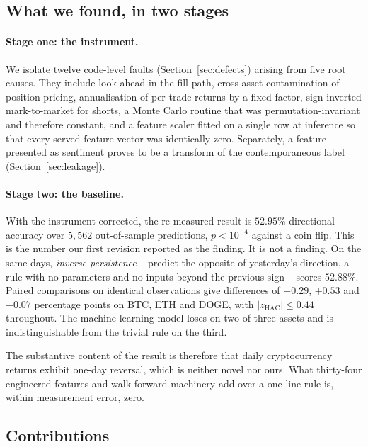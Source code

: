 \documentclass[preprint,12pt,authoryear]{elsarticle}
\begin{document}
\subsection{What we found, in two stages}

\paragraph{Stage one: the instrument.} We isolate twelve code-level faults
(Section~\ref{sec:defects}) arising from five root causes. They include
look-ahead in the fill path, cross-asset contamination of position pricing,
annualisation of per-trade returns by a fixed factor, sign-inverted
mark-to-market for shorts, a Monte Carlo routine that was permutation-invariant
and therefore constant, and a feature scaler fitted on a single row at inference
so that every served feature vector was identically zero. Separately, a feature
presented as sentiment proves to be a transform of the contemporaneous label
(Section~\ref{sec:leakage}).

\paragraph{Stage two: the baseline.} With the instrument corrected, the
re-measured result is $52.95\%$ directional accuracy over $5{,}562$
out-of-sample predictions, $p < 10^{-4}$ against a coin flip. This is the number
our first revision reported as the finding. It is not a finding. On the same
days, \emph{inverse persistence} -- predict the opposite of yesterday's
direction, a rule with no parameters and no inputs beyond the previous sign --
scores $52.88\%$. Paired comparisons on identical observations give differences
of $-0.29$, $+0.53$ and $-0.07$ percentage points on BTC, ETH and DOGE, with
$|z_{\mathrm{HAC}}| \le 0.44$ throughout. The machine-learning model loses on two of three
assets and is indistinguishable from the trivial rule on the third.

The substantive content of the result is therefore that daily cryptocurrency
returns exhibit one-day reversal, which is neither novel nor ours. What thirty-four
engineered features and walk-forward machinery add over a one-line rule is,
within measurement error, zero.

\subsection{Contributions}
\end{document}
